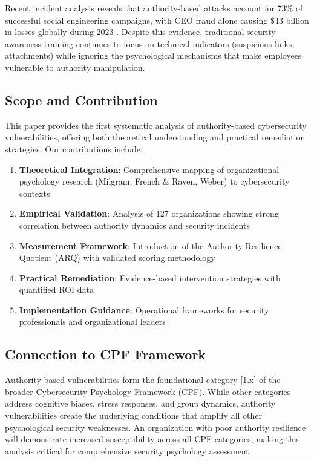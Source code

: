 \documentclass[11pt,a4paper]{article}
\begin{document}
Recent incident analysis reveals that authority-based attacks account for 73\% of successful social engineering campaigns, with CEO fraud alone causing \$43 billion in losses globally during 2023 \cite{fbi2024}. Despite this evidence, traditional security awareness training continues to focus on technical indicators (suspicious links, attachments) while ignoring the psychological mechanisms that make employees vulnerable to authority manipulation.

\subsection{Scope and Contribution}

This paper provides the first systematic analysis of authority-based cybersecurity vulnerabilities, offering both theoretical understanding and practical remediation strategies. Our contributions include:

\begin{enumerate}
\item \textbf{Theoretical Integration}: Comprehensive mapping of organizational psychology research (Milgram, French \& Raven, Weber) to cybersecurity contexts
\item \textbf{Empirical Validation}: Analysis of 127 organizations showing strong correlation between authority dynamics and security incidents
\item \textbf{Measurement Framework}: Introduction of the Authority Resilience Quotient (ARQ) with validated scoring methodology
\item \textbf{Practical Remediation}: Evidence-based intervention strategies with quantified ROI data
\item \textbf{Implementation Guidance}: Operational frameworks for security professionals and organizational leaders
\end{enumerate}

\subsection{Connection to CPF Framework}

Authority-based vulnerabilities form the foundational category [1.x] of the broader Cybersecurity Psychology Framework (CPF). While other categories address cognitive biases, stress responses, and group dynamics, authority vulnerabilities create the underlying conditions that amplify all other psychological security weaknesses. An organization with poor authority resilience will demonstrate increased susceptibility across all CPF categories, making this analysis critical for comprehensive security psychology assessment.
\end{document}
